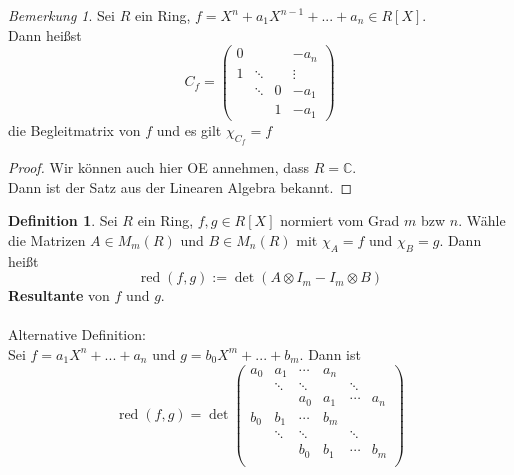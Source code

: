 \documentclass[10pt,a4paper]{article}
\newcommand{\C}{\ensuremath{\mathbb{C}}}
\newcommand{\res}{\ensuremath{\operatorname{red}}}
\newcounter{thm}[section]
\theoremstyle{definition}
\newtheorem{definition}[thm]{Definition}
\theoremstyle{plain}
\theoremstyle{remark}
\newtheorem{bem}[thm]{Bemerkung}
\begin{document}
\begin{bem}
	Sei $R$ ein Ring, $f=X^n+a_1X^{n-1}+...+a_n\in R[X]$.\\
	Dann heißst
	\[C_f=\begin{pmatrix}
	0&&&-a_n\\
	1&\ddots&&\vdots\\
	&\ddots&0&-a_1\\
	&&1&-a_1
	\end{pmatrix}\]
	die Begleitmatrix von $f$ und es gilt $\chi_{C_f}=f$
\end{bem}
\begin{proof}
	Wir können auch hier OE annehmen, dass $R=\C$.\\
	Dann ist der Satz aus der Linearen Algebra bekannt.
\end{proof}

\begin{definition}
	Sei $R$ ein Ring, $f,g\in R[X]$ normiert vom Grad $m$ bzw $n$. Wähle die Matrizen $A\in M_m(R)$ und $B\in M_n(R)$ mit $\chi_A=f$ und $\chi_B=g$. Dann heißt
	\[\res(f,g):=\det(A\otimes I_m-I_m\otimes B)\]
	\textbf{Resultante} von $f$ und $g$.\\
	\\
	Alternative Definition:\\
	Sei $f=a_1X^n+...+a_n$ und $g=b_0X^m+...+b_m$. Dann ist
	\[\res(f,g)=\det
	\begin{pmatrix}
	a_0&a_1   &\cdots&a_n   &      &      \\
	   &\ddots&\ddots&      &\ddots&      \\
	   &      &a_0   &a_1   &\cdots&a_n   \\
	b_0&b_1   &\cdots&b_m   &      &      \\
	   &\ddots&\ddots&      &\ddots&      \\
	   &      &b_0   &b_1   &\cdots&b_m   \\
	\end{pmatrix}\]
\end{definition}
\end{document}
